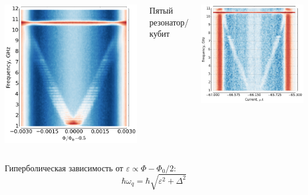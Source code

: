\documentclass[aspectratio=169, 13pt]{beamer}
\begin{document}
{\begin{columns}[t]
\vspace{0.2cm}
\includegraphics[width=\textwidth]{two-tone_spectrum3}

\centering
Пятый резонатор/кубит

\vspace{0.2cm}
\includegraphics[width=\textwidth]{two-tone_spectrum2}

\end{columns}

\vspace{0.5cm}
Гиперболическая зависимость от $\varepsilon\propto \Phi - \Phi_0/2$:
\centering
\begin{equation*}
\hbar \omega_q = \hbar\sqrt{\varepsilon^2+\Delta^2}
\end{equation*}
}
\end{document}
